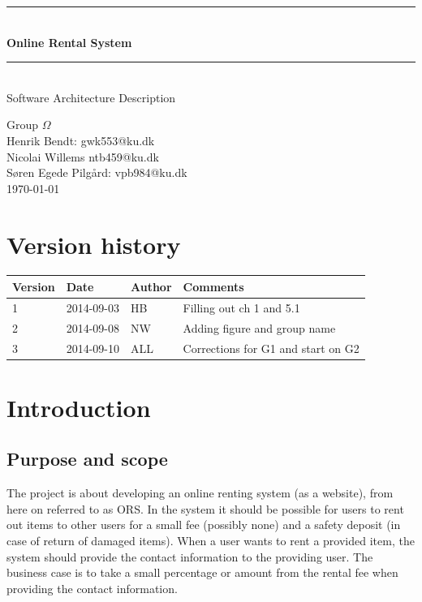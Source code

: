 \documentclass[a4paper,11pt]{report}
\makeatletter
\newcommand{\systemname}{Online Rental System}
\newcommand{\groupname}{Group $\Omega$}
\newcommand{\contactdetails}{Henrik Bendt: gwk553@ku.dk\\Nicolai Willems ntb459@ku.dk\\Søren Egede Pilgård: vpb984@ku.dk}
\makeatother
\begin{document}
%
%
\newcommand{\HRule}{\rule{\linewidth}{0.5mm}}
\begin{titlepage}

  \begin{center}

    \vspace*{4cm}
    \HRule \\[0.4cm]
    { \huge \bfseries \systemname}\\[0.4cm]
    \HRule \\[1.5cm]

    {\Large Software Architecture Description}

    \vfill
  \end{center}

  \begin{flushleft}
    {\LARGE \groupname}\\[0.2cm]
    {\large \contactdetails}\\[0.2cm]
   {\large \today}
  \end{flushleft}
\end{titlepage}

%
%
\newpage
\chapter*{Version history}

\begin{center}
  \begin{tabular}[h!]{| l | l | l | p{8 cm} |}
    \hline
    \rowcolor{gray}
    Version & Date & Author & Comments \\
    \hline
    \hline
    1 & 2014-09-03 & HB & Filling out ch 1 and 5.1\\
    \hline
    2 & 2014-09-08 & NW & Adding figure and group name \\
    \hline
    3 & 2014-09-10 & ALL & Corrections for G1 and start on G2 \\
  \end{tabular}
\end{center}

%
%
\setcounter{tocdepth}{1}
\tableofcontents

%
%
\chapter{Introduction}
\label{cha:introduction}
\thispagestyle{fancy}


\section{Purpose and scope}
\label{sec:purpose-scope}
The project is about developing an online renting system (as a website), from
here on referred to as ORS. In the system it should be possible for users to
rent out items to other users for a small fee (possibly none) and a safety
deposit (in case of return of damaged items). When a user wants to rent a
provided item, the system should provide the contact information to the
providing user. The business case is to take a small percentage or amount from
the rental fee when providing the contact information.
\end{document}
